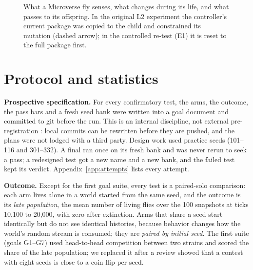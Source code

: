 \documentclass[11pt]{article}
\begin{document}
\begin{figure}[t]
\caption{What a Microverse fly senses, what changes during its life, and what passes to its offspring. In the original L2 experiment the controller's current package was copied to the child and constrained its mutation (dashed arrow); in the controlled re-test (E1) it is reset to the full package first.}
\label{fig:controller}
\end{figure}

\section{Protocol and statistics}
\label{sec:protocol}

\textbf{Prospective specification.} For every confirmatory test, the arms, the outcome, the pass bars and a fresh seed bank were written into a goal document and committed to git before the run. This is an internal discipline, not external pre-registration \citep{nosek2018preregistration}: local commits can be rewritten before they are pushed, and the plans were not lodged with a third party. Design work used practice seeds (101--116 and 301--332). A final ran once on its fresh bank and was never rerun to seek a pass; a redesigned test got a new name and a new bank, and the failed test kept its verdict. Appendix~\ref{app:attempts} lists every attempt.

\textbf{Outcome.} Except for the first goal suite, every test is a paired-solo comparison: each arm lives alone in a world started from the same seed, and the outcome is its \emph{late population}, the mean number of living flies over the 100 snapshots at ticks 10,100 to 20,000, with zero after extinction. Arms that share a seed start identically but do not see identical histories, because behavior changes how the world's random stream is consumed; they are \emph{paired by initial seed}. The first suite (goals G1--G7) used head-to-head competition between two strains and scored the share of the late population; we replaced it after a review showed that a contest with eight seeds is close to a coin flip per seed.
\end{document}
